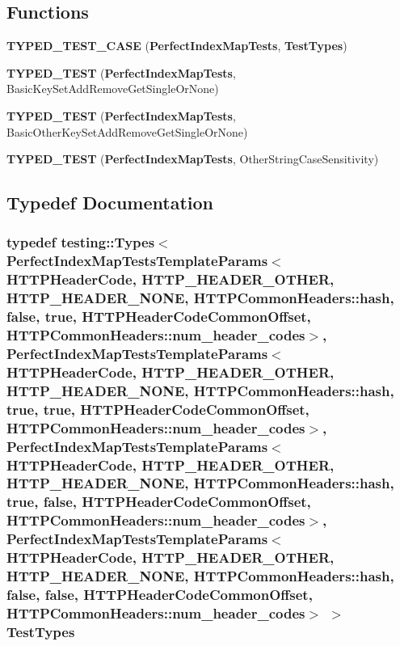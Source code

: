\subsection*{Functions}
\begin{DoxyCompactItemize}
\item 
{\bf T\+Y\+P\+E\+D\+\_\+\+T\+E\+S\+T\+\_\+\+C\+A\+SE} ({\bf Perfect\+Index\+Map\+Tests}, {\bf Test\+Types})
\item 
{\bf T\+Y\+P\+E\+D\+\_\+\+T\+E\+ST} ({\bf Perfect\+Index\+Map\+Tests}, Basic\+Key\+Set\+Add\+Remove\+Get\+Single\+Or\+None)
\item 
{\bf T\+Y\+P\+E\+D\+\_\+\+T\+E\+ST} ({\bf Perfect\+Index\+Map\+Tests}, Basic\+Other\+Key\+Set\+Add\+Remove\+Get\+Single\+Or\+None)
\item 
{\bf T\+Y\+P\+E\+D\+\_\+\+T\+E\+ST} ({\bf Perfect\+Index\+Map\+Tests}, Other\+String\+Case\+Sensitivity)
\end{DoxyCompactItemize}


\subsection{Typedef Documentation}
\subsubsection[{Test\+Types}]{\setlength{\rightskip}{0pt plus 5cm}typedef testing\+::\+Types$<$ {\bf Perfect\+Index\+Map\+Tests\+Template\+Params}$<$ {\bf H\+T\+T\+P\+Header\+Code}, H\+T\+T\+P\+\_\+\+H\+E\+A\+D\+E\+R\+\_\+\+O\+T\+H\+ER, H\+T\+T\+P\+\_\+\+H\+E\+A\+D\+E\+R\+\_\+\+N\+O\+NE, H\+T\+T\+P\+Common\+Headers\+::hash, false, true, H\+T\+T\+P\+Header\+Code\+Common\+Offset, H\+T\+T\+P\+Common\+Headers\+::num\+\_\+header\+\_\+codes$>$, {\bf Perfect\+Index\+Map\+Tests\+Template\+Params}$<$ {\bf H\+T\+T\+P\+Header\+Code}, H\+T\+T\+P\+\_\+\+H\+E\+A\+D\+E\+R\+\_\+\+O\+T\+H\+ER, H\+T\+T\+P\+\_\+\+H\+E\+A\+D\+E\+R\+\_\+\+N\+O\+NE, H\+T\+T\+P\+Common\+Headers\+::hash, true, true, H\+T\+T\+P\+Header\+Code\+Common\+Offset, H\+T\+T\+P\+Common\+Headers\+::num\+\_\+header\+\_\+codes$>$, {\bf Perfect\+Index\+Map\+Tests\+Template\+Params}$<$ {\bf H\+T\+T\+P\+Header\+Code}, H\+T\+T\+P\+\_\+\+H\+E\+A\+D\+E\+R\+\_\+\+O\+T\+H\+ER, H\+T\+T\+P\+\_\+\+H\+E\+A\+D\+E\+R\+\_\+\+N\+O\+NE, H\+T\+T\+P\+Common\+Headers\+::hash, true, false, H\+T\+T\+P\+Header\+Code\+Common\+Offset, H\+T\+T\+P\+Common\+Headers\+::num\+\_\+header\+\_\+codes$>$, {\bf Perfect\+Index\+Map\+Tests\+Template\+Params}$<$ {\bf H\+T\+T\+P\+Header\+Code}, H\+T\+T\+P\+\_\+\+H\+E\+A\+D\+E\+R\+\_\+\+O\+T\+H\+ER, H\+T\+T\+P\+\_\+\+H\+E\+A\+D\+E\+R\+\_\+\+N\+O\+NE, H\+T\+T\+P\+Common\+Headers\+::hash, false, false, H\+T\+T\+P\+Header\+Code\+Common\+Offset, H\+T\+T\+P\+Common\+Headers\+::num\+\_\+header\+\_\+codes$>$ $>$ {\bf Test\+Types}}\label{PerfectIndexMapTest_8cpp_ae16511366a77c1997dc454718c576062}


